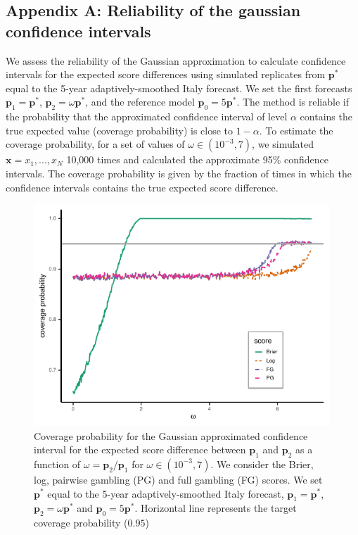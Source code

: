 \documentclass[referee,sn-basic]{sn-jnl}
\theoremstyle{thmstyleone}%
\theoremstyle{thmstyletwo}%
\theoremstyle{thmstylethree}%
\begin{document}
\begin{appendices}

\section{Appendix A: Reliability of the gaussian confidence intervals}\label{secA1}

We assess the reliability of the Gaussian approximation to calculate confidence intervals for the expected score differences using simulated replicates from $\mathbf p^*$ equal to the 5-year adaptively-smoothed Italy forecast. We set the first forecasts $\mathbf p_1 = \mathbf p^*$, $\mathbf p_2 = \omega \mathbf p^*$, and the reference model $\mathbf p_0 = 5 \mathbf p^*$.
The method is reliable if the probability that the approximated confidence interval of level $\alpha$ contains the true expected value (coverage probability) is close to $1 - \alpha$. 
To estimate the coverage probability, for a set of values of $\omega \in (10^{-3}, 7)$, we simulated $\mathbf x = x_1,...,x_N$ 10,000 times and calculated the approximate 95\% confidence intervals. The coverage probability is given by the fraction of times in which the confidence intervals contains the true expected score difference. 

\begin{figure}[H]
  \includegraphics[width = 0.99\textwidth]{figure13.pdf}
\caption{Coverage probability for the Gaussian approximated confidence interval for the expected score difference  between $\mathbf p_1$ and $\mathbf p_2$ as a function of $\omega = \mathbf p_2/ \mathbf p_1$ for $\omega \in (10^{-3}, 7)$. We consider the Brier, log, pairwise gambling (PG) and full gambling (FG) scores. We set $\mathbf p^*$ equal to the 5-year adaptively-smoothed Italy forecast, $\mathbf p_1 = \mathbf p^*$, $\mathbf p_2 = \omega \mathbf p^*$ and $\mathbf p_0 = 5\mathbf p^*$. Horizontal line represents the target coverage probability ($0.95$) }
\label{fig:13}
\end{figure}


\end{appendices}
\end{document}
